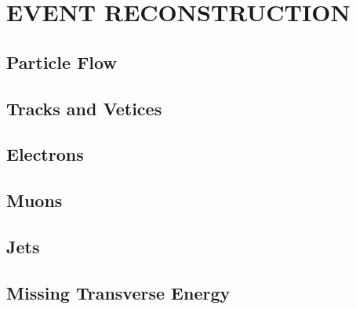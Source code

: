 %
%
%



\chapter{\uppercase {Event Reconstruction}}

\section{Particle Flow}

\section{Tracks and Vetices}

\section{Electrons}

\section{Muons}

\section{Jets}

\section{Missing Transverse Energy}